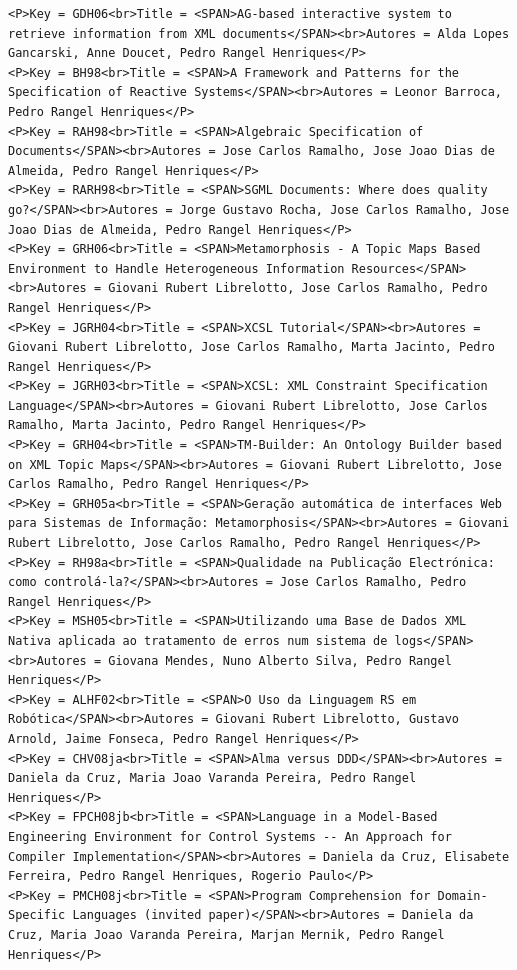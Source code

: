 \documentclass[11pt,a4paper]{report}
\begin{document}
\begin{appendices}
\begin{lstlisting}
<P>Key = GDH06<br>Title = <SPAN>AG-based interactive system to retrieve information from XML documents</SPAN><br>Autores = Alda Lopes Gancarski, Anne Doucet, Pedro Rangel Henriques</P>
<P>Key = BH98<br>Title = <SPAN>A Framework and Patterns for the   Specification of Reactive Systems</SPAN><br>Autores = Leonor Barroca, Pedro Rangel Henriques</P>
<P>Key = RAH98<br>Title = <SPAN>Algebraic Specification of Documents</SPAN><br>Autores = Jose Carlos Ramalho, Jose Joao Dias de Almeida, Pedro Rangel Henriques</P>
<P>Key = RARH98<br>Title = <SPAN>SGML Documents: Where does quality go?</SPAN><br>Autores = Jorge Gustavo Rocha, Jose Carlos Ramalho, Jose Joao Dias de Almeida, Pedro Rangel Henriques</P>
<P>Key = GRH06<br>Title = <SPAN>Metamorphosis - A Topic Maps Based Environment to Handle Heterogeneous Information Resources</SPAN><br>Autores = Giovani Rubert Librelotto, Jose Carlos Ramalho, Pedro Rangel Henriques</P>
<P>Key = JGRH04<br>Title = <SPAN>XCSL Tutorial</SPAN><br>Autores = Giovani Rubert Librelotto, Jose Carlos Ramalho, Marta Jacinto, Pedro Rangel Henriques</P>
<P>Key = JGRH03<br>Title = <SPAN>XCSL: XML Constraint Specification Language</SPAN><br>Autores = Giovani Rubert Librelotto, Jose Carlos Ramalho, Marta Jacinto, Pedro Rangel Henriques</P>
<P>Key = GRH04<br>Title = <SPAN>TM-Builder: An Ontology Builder based on XML Topic Maps</SPAN><br>Autores = Giovani Rubert Librelotto, Jose Carlos Ramalho, Pedro Rangel Henriques</P>
<P>Key = GRH05a<br>Title = <SPAN>Geração automática de interfaces Web para Sistemas de Informação: Metamorphosis</SPAN><br>Autores = Giovani Rubert Librelotto, Jose Carlos Ramalho, Pedro Rangel Henriques</P>
<P>Key = RH98a<br>Title = <SPAN>Qualidade na Publicação Electrónica: como controlá-la?</SPAN><br>Autores = Jose Carlos Ramalho, Pedro Rangel Henriques</P>
<P>Key = MSH05<br>Title = <SPAN>Utilizando uma Base de Dados XML Nativa aplicada ao tratamento de erros num sistema de logs</SPAN><br>Autores = Giovana Mendes, Nuno Alberto Silva, Pedro Rangel Henriques</P>
<P>Key = ALHF02<br>Title = <SPAN>O Uso da Linguagem RS em Robótica</SPAN><br>Autores = Giovani Rubert Librelotto, Gustavo Arnold, Jaime Fonseca, Pedro Rangel Henriques</P>
<P>Key = CHV08ja<br>Title = <SPAN>Alma versus DDD</SPAN><br>Autores = Daniela da Cruz, Maria Joao Varanda Pereira, Pedro Rangel Henriques</P>
<P>Key = FPCH08jb<br>Title = <SPAN>Language in a Model-Based Engineering Environment for Control Systems -- An Approach for Compiler Implementation</SPAN><br>Autores = Daniela da Cruz, Elisabete Ferreira, Pedro Rangel Henriques, Rogerio Paulo</P>
<P>Key = PMCH08j<br>Title = <SPAN>Program Comprehension for Domain-Specific Languages (invited paper)</SPAN><br>Autores = Daniela da Cruz, Maria Joao Varanda Pereira, Marjan Mernik, Pedro Rangel Henriques</P>

\end{lstlisting}
\end{appendices}
\end{document}
